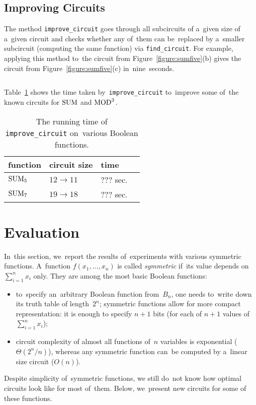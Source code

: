 \subsection{Improving Circuits}
The method \texttt{improve_circuit}
goes through all subcircuits of a~given size
of a~given circuit and checks whether any
of~them can be~replaced by a~smaller subcircuit
(computing the same function) via \texttt{find_circuit}. For example, applying this method
to~the circuit from Figure~\ref{figure:sumfive}(b)
gives the circuit from Figure~\ref{figure:sumfive}(c)
in~nine~seconds.
%
\inputminted[firstline=62,lastline=67]{python}{../tutorial.py}
%
%
Table~\ref{table:improvementrunningtimes} shows the time 
taken by~\texttt{improve\_circuit} to~improve some 
of~the known circuits for $\operatorname{SUM}$ and $\operatorname{MOD}^3$. 

\begin{table}[ht]
\begin{center}
\begin{tabular}{llll}
\toprule
function & circuit size & time\\
\midrule
$\operatorname{SUM}_5$ & $12 \to 11$ & ??? sec.\\
$\operatorname{SUM}_7$ & $19 \to 18$ & ??? sec.\\
\bottomrule
\end{tabular}
\end{center}
\caption{The running time of \texttt{improve\_circuit} on~various Boolean functions.} \label{table:improvementrunningtimes}
\end{table}



\section{Evaluation}
In~this section, we~report the results of~experiments
with various symmetric functions. A~function $f(x_1,\dotsc,x_n)$ is called \emph{symmetric} if~its value depends on~$\sum_{i=1}^nx_i$ only. They are among the most basic Boolean functions:
\begin{itemize}
\item to~specify an~arbitrary Boolean function
from~$B_n$, one needs
to~write down its truth table of length~$2^n$; symmetric functions allow for more compact representation: it is enough to specify $n+1$ bits (for each of $n+1$ values
of~$\sum_{i=1}^nx_i$);
\item circuit complexity of almost all functions
of~$n$ variables is exponential ($\Theta(2^n/n)$), whereas any symmetric function can~be computed by a~linear size circuit ($O(n)$).
\end{itemize}
Despite simplicity of~symmetric functions, we still do~not
know how optimal circuits look like for most of~them. Below, we~present new circuits for some of these functions.

